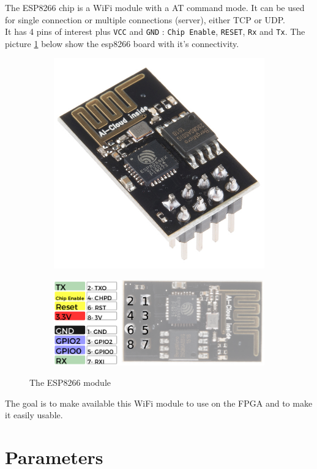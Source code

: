 \documentclass[11pt]{article}
\begin{document}
The ESP8266 chip is a WiFi module with a AT command mode. It can be used for 
single connection or multiple connections (server), either TCP or UDP.\\
It has 4 pins of interest plus \texttt{VCC} and \texttt{GND} : \texttt{Chip Enable}, \texttt{RESET}, \texttt{Rx} and \texttt{Tx}. The picture \ref{esp8266} below show the esp8266 board with it's connectivity.
\begin{figure}[H]
\centering
\begin{subfigure}{.7\textwidth}
  \centering
  \includegraphics[width=.7\linewidth]{ESP8266.jpg}
\end{subfigure}%

\begin{subfigure}{.9\textwidth}
  \centering
  \includegraphics[width=.9\linewidth]{ESP8266_pinout.png}
\end{subfigure}
\caption{The ESP8266 module}
\label{esp8266}
\end{figure}

The goal is to make available this WiFi module to use on the FPGA and to make it easily usable.
\newpage
\section{Parameters}
\end{document}
